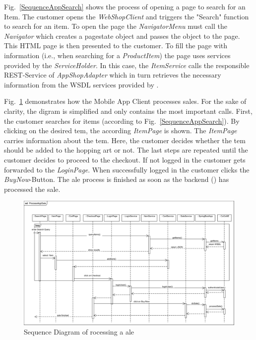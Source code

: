 Fig.~\ref{SequenceAppSearch} shows the process of opening a page to search for an Item. 
The customer opens the \textit{WebShopClient} and triggers the "Search" function to search for an item. 
To open the page the \textit{NavigatorMenu} must call the \textit{Navigator} which creates a pagestate object and passes the object to the page. 
This HTML page is then presented to the customer. 
To fill the page with information (i.e., when searching for a \textit{ProductItem}) the page uses services provided by the \textit{ServiceHolder}. 
In this case, the \textit{ItemService} calls the responsible REST-Service of \textit{AppShopAdapter} which in turn retrieves the necessary information from the WSDL services provided by \CoCoME.

Fig.~\ref{SequenceAppSale} demonstrates how the Mobile App Client processes sales. 
For the sake of clarity, the digram is simplified and only contains the most important calls. 
First, the customer searches for items (according to Fig.~\ref{SequenceAppSearch}). 
By clicking on the desired tem, the according \textit{ItemPage} is shown. 
The \textit{ItemPage} carries information about the tem. 
Here, the customer decides whether the tem should be added to the hopping art or not. 
The last steps are repeated until the customer decides to proceed to the checkout. 
If not logged in the customer gets forwarded to the \textit{LoginPage}. 
When successfully logged in the customer clicks the \textit{BuyNow}-Button. 
The ale process is finished as soon as the backend (\CoCoME) has processed the sale.


\begin{figure}[!h]
	\includegraphics[width=\textwidth]{img/appProcessSale.png}
	\caption{Sequence Diagram of rocessing a ale}
	\label{SequenceAppSale}
\end{figure}

